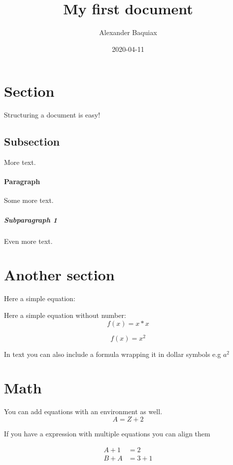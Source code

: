 \documentclass{article}
\title{My first document}
\date{2020-04-11}
\author{Alexander Baquiax}
\begin{document}

\maketitle
\newpage

\doublespacing
\tableofcontents
\singlespacing
\newpage




\section{Section}
Structuring a document is easy!

\subsection{Subsection}
More text.

\paragraph{Paragraph}
Some more text.

\subparagraph{Subparagraph 1}
Even more text.

\section{Another section}

Here a simple equation:

Here a simple equation without number:
\begin{equation*}
    f(x) = x*x
\end{equation*}

\begin{equation}
    f(x) = x^2
\end{equation}

In text you can also include a formula wrapping it in dollar symbols e.g $a^2$

\section{Math}
You can add equations with an environment as well.
\begin{equation}
    A = Z + 2
\end{equation}

If you have a expression with multiple equations you can align them

\begin{align}
    A + 1 & = 2     \\ %
    B + A & = 3 + 1 %
\end{align}
\end{document}
